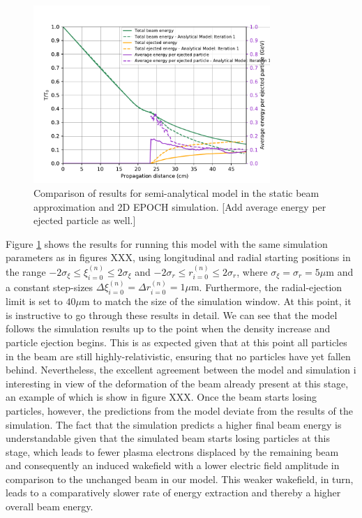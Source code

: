\begin{figure}
\centering
\includegraphics[width=0.8\textwidth]{EnergiesIteration1.pdf}
\caption{Comparison of results for semi-analytical model in the static beam approximation and 2D EPOCH simulation. [Add average energy per ejected particle as well.]}
\label{ConstantPlowIteration1}
\end{figure}
\indent Figure \ref{ConstantPlowIteration1} shows the results for running this model with the same simulation parameters as in figures XXX, using longitudinal and radial starting positions in the range $-2\sigma_{\xi}  \leq  \xi_{i=0}^{(n)} \leq 2\sigma_{\xi}$ and $-2\sigma_{r} \leq  r_{i=0}^{(n)} \leq 2\sigma_{r}$, where $\sigma_{\xi}=\sigma_{r}=5\mu \text{m}$ and a constant step-sizes $\Delta \xi_{i=0}^{(n)}=\Delta r_{i=0}^{(n)}=1\mu \text{m}$. Furthermore, the radial-ejection limit is set to $40 \mu \text{m}$ to match the size of the simulation window. At this point, it is instructive to go through these results in detail. We can see that the model follows the simulation results up to the point when the density increase and particle ejection begins. This is as expected given that at this point all particles in the beam are still highly-relativistic, ensuring that no particles have yet fallen behind. Nevertheless, the excellent agreement between the model and simulation i interesting in view of the deformation of the beam already present at this stage, an example of which is show in figure XXX. Once the beam starts losing particles, however, the predictions from the model deviate from the results of the simulation. The fact that the simulation predicts a higher final beam energy is understandable given that the simulated beam starts losing particles at this stage, which leads to fewer plasma electrons displaced by the remaining beam and consequently an induced wakefield with a lower electric field amplitude in comparison to the unchanged beam in our model. This weaker wakefield, in turn, leads to a comparatively slower rate of energy extraction and thereby a higher overall beam energy. \\
